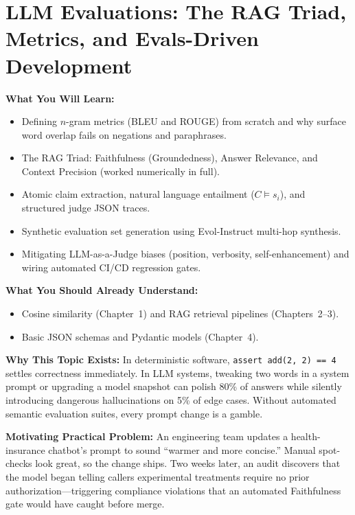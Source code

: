\chapter{LLM Evaluations: The RAG Triad, Metrics, and Evals-Driven Development}
\label{chap:evals}

\begin{chaptergoalsbox}
\textbf{What You Will Learn:}
\begin{itemize}[leftmargin=15pt]
  \item Defining $n$-gram metrics (BLEU and ROUGE) from scratch and why surface word overlap fails on negations and paraphrases.
  \item The RAG Triad: Faithfulness (Groundedness), Answer Relevance, and Context Precision (worked numerically in full).
  \item Atomic claim extraction, natural language entailment ($C \models s_i$), and structured judge JSON traces.
  \item Synthetic evaluation set generation using Evol-Instruct multi-hop synthesis.
  \item Mitigating LLM-as-a-Judge biases (position, verbosity, self-enhancement) and wiring automated CI/CD regression gates.
\end{itemize}

\textbf{What You Should Already Understand:}
\begin{itemize}[leftmargin=15pt]
  \item Cosine similarity (Chapter~1) and RAG retrieval pipelines (Chapters~2--3).
  \item Basic JSON schemas and Pydantic models (Chapter~4).
\end{itemize}

\textbf{Why This Topic Exists:}
In deterministic software, \texttt{assert add(2, 2) == 4} settles correctness immediately. In LLM systems, tweaking two words in a system prompt or upgrading a model snapshot can polish 80\% of answers while silently introducing dangerous hallucinations on 5\% of edge cases. Without automated semantic evaluation suites, every prompt change is a gamble.

\textbf{Motivating Practical Problem:}
An engineering team updates a health-insurance chatbot's prompt to sound ``warmer and more concise.'' Manual spot-checks look great, so the change ships. Two weeks later, an audit discovers that the model began telling callers experimental treatments require no prior authorization—triggering compliance violations that an automated Faithfulness gate would have caught before merge.
\end{chaptergoalsbox}

